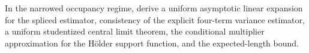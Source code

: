 In the narrowed occupancy regime, derive a uniform asymptotic linear expansion for the spliced estimator, consistency of the explicit four-term variance estimator, a uniform studentized central limit theorem, the conditional multiplier approximation for the Hölder support function, and the expected-length bound.